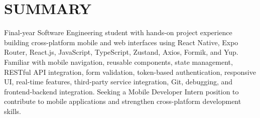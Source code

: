 \section{SUMMARY}
\noindent Final-year Software Engineering student with hands-on project experience building cross-platform mobile and web interfaces using React Native, Expo Router, React.js, JavaScript, TypeScript, Zustand, Axios, Formik, and Yup. Familiar with mobile navigation, reusable components, state management, RESTful API integration, form validation, token-based authentication, responsive UI, real-time features, third-party service integration, Git, debugging, and frontend-backend integration. Seeking a Mobile Developer Intern position to contribute to mobile applications and strengthen cross-platform development skills.
